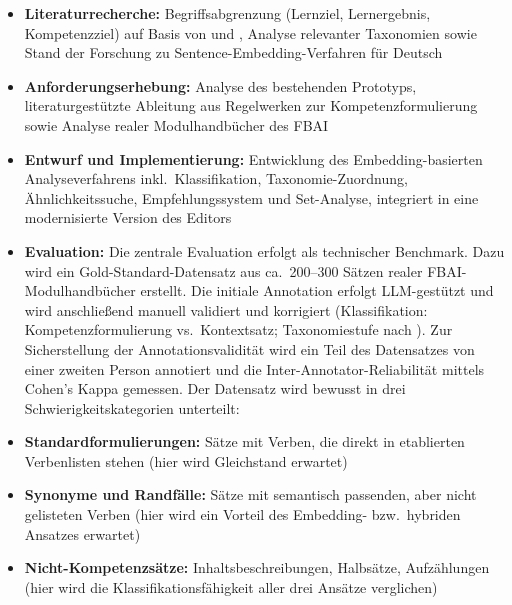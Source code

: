 \documentclass[12pt,a4paper]{article}
\begin{document}
\begin{itemize}[leftmargin=1.5em, itemsep=2pt]
  \item \textbf{Literaturrecherche:} Begriffsabgrenzung (Lernziel, Lernergebnis, Kompetenzziel) auf Basis von \citet{Weinert2001} und \citet{Schaper2012}, Analyse relevanter Taxonomien \citep{Bloom1956, AndersonKrathwohl2001} sowie Stand der Forschung zu Sentence-Embedding-Verfahren f\"ur Deutsch \citep{ReimersGurevych2019}
  \item \textbf{Anforderungserhebung:} Analyse des bestehenden Prototyps, literaturgest\"utzte Ableitung aus Regelwerken zur Kompetenzformulierung \citep{HRKnexus2015, CursioJahn2014} sowie Analyse realer Modulhandb\"ucher des FBAI
  \item \textbf{Entwurf und Implementierung:} Entwicklung des Embedding-basierten Analyseverfahrens inkl.\ Klassifikation, Taxonomie-Zuordnung, \"Ahnlichkeitssuche, Empfehlungssystem und Set-Analyse, integriert in eine modernisierte Version des Editors
  \item \textbf{Evaluation:} Die zentrale Evaluation erfolgt als technischer Benchmark. Dazu wird ein Gold-Standard-Datensatz aus ca.\ 200--300 S\"atzen realer FBAI-Modulhandb\"ucher erstellt. Die initiale Annotation erfolgt LLM-gest\"utzt und wird anschlie\ss end manuell validiert und korrigiert (Klassifikation: Kompetenzformulierung vs.\ Kontextsatz; Taxonomiestufe nach \citealp{AndersonKrathwohl2001}). Zur Sicherstellung der Annotationsvalidit\"at wird ein Teil des Datensatzes von einer zweiten Person annotiert und die Inter-Annotator-Reliabilit\"at mittels Cohen's Kappa gemessen. Der Datensatz wird bewusst in drei Schwierigkeitskategorien unterteilt:
\end{itemize}

\begin{itemize}[leftmargin=3em, itemsep=2pt]
  \item \textbf{Standardformulierungen:} S\"atze mit Verben, die direkt in etablierten Verbenlisten stehen (hier wird Gleichstand erwartet)
  \item \textbf{Synonyme und Randf\"alle:} S\"atze mit semantisch passenden, aber nicht gelisteten Verben (hier wird ein Vorteil des Embedding- bzw.\ hybriden Ansatzes erwartet)
  \item \textbf{Nicht-Kompetenzs\"atze:} Inhaltsbeschreibungen, Halbs\"atze, Aufz\"ahlungen (hier wird die Klassifikationsf\"ahigkeit aller drei Ans\"atze verglichen)
\end{itemize}
\end{document}
